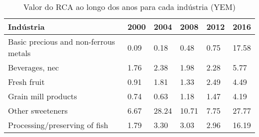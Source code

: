 \begin{table}
\centering
\caption{Valor do RCA ao longo dos anos para cada indústria (YEM)}
\begin{tabular}{p{6cm}p{1.5cm}p{1.5cm}p{1.5cm}p{1.5cm}p{1.5cm}}
\toprule
                            Indústria & 2000 &  2004 &  2008 & 2012 &  2016 \\
\midrule
Basic precious and non-ferrous metals & 0.09 &  0.18 &  0.48 & 0.75 & 17.58 \\
                       Beverages, nec & 1.76 &  2.38 &  1.98 & 2.28 &  5.77 \\
                          Fresh fruit & 0.91 &  1.81 &  1.33 & 2.49 &  4.49 \\
                  Grain mill products & 0.74 &  0.63 &  1.18 & 1.47 &  4.19 \\
                     Other sweeteners & 6.67 & 28.24 & 10.71 & 7.75 & 27.77 \\
        Processing/preserving of fish & 1.79 &  3.30 &  3.03 & 2.96 & 16.19 \\
\bottomrule
\end{tabular}
\end{table}
